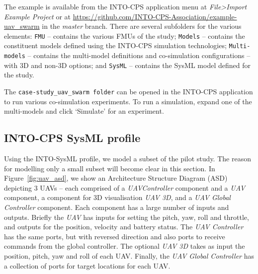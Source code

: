The example is available from the INTO-CPS application menu at \emph{File>Import Example Project} or at  \url{https://github.com/INTO-CPS-Association/example-uav_swarm} in the \emph{master} branch. There are several subfolders for the various elements: \texttt{FMU} -- contains the various FMUs of the study; \texttt{Models} -- contains the constituent models defined using the INTO-CPS simulation technologies; \texttt{Multi-models} -- contains the multi-model definitions and co-simulation configurations -- with 3D and non-3D options; and \texttt{SysML} -- contains the SysML model defined for the study.

The \texttt{case-study\_uav\_swarm folder} can be opened in the INTO-CPS application to run various co-simulation experiments. To run a simulation, expand one of the multi-models and click `Simulate' for an experiment. 


\subsection{INTO-CPS SysML profile}
\label{sec:uavswarm_into_sys}

Using the INTO-SysML profile, we model a subset of the pilot study. The reason for modelling only a small subset will become clear in this section. In Figure~\ref{fig:uav_asd}, we show an Architecture Structure Diagram (ASD) depicting 3 UAVs -- each comprised of a \emph{UAVController} component and a \emph{UAV} component, a component for 3D visualisation \emph{UAV 3D}, and a \emph{UAV Global Controller} component. Each component has a large number of inputs and outputs. Briefly the \emph{UAV} has inputs for setting the pitch, yaw, roll and throttle, and outputs for the position, velocity and battery status. The \emph{UAV Controller} has the same ports, but with reversed direction and also ports to receive commands from the global controller. The optional \emph{UAV 3D} takes as input the position, pitch, yaw and roll of each UAV. Finally, the \emph{UAV Global Controller} has a collection of ports for target locations for each UAV. 

